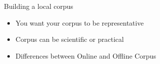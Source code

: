 \documentclass{beamer}
\begin{document}
\begin{frame}{Building a local corpus}
\begin{itemize}
\pause
\item You want your corpus to be representative
\pause
\item Corpus can be scientific or practical
\pause
\item Differences between Online and Offline Corpus

\begin{table}
\centering
\caption{Pros and Cons of Using a Local Corpus}
\label{pros_cons}
\end{table}



\end{itemize}


\end{frame}
\end{document}
